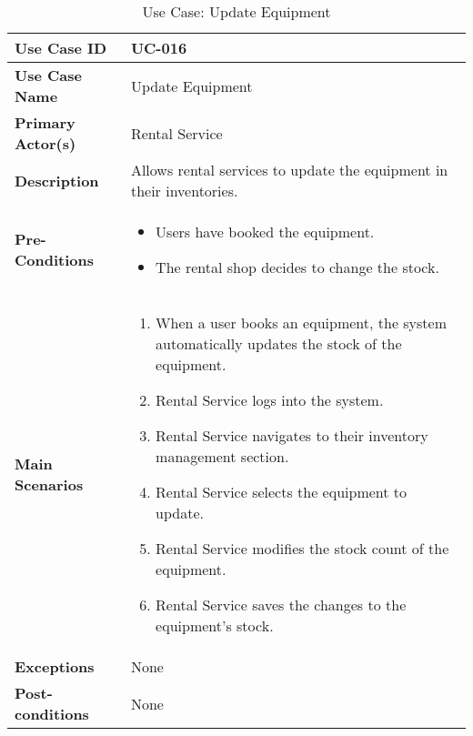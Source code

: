 \begin{table}[ht]
    \centering
    \begin{tabular}{|l|p{}|}
        \hline
        \textbf{Use Case ID} & UC-016 \\
        \hline
        \textbf{Use Case Name} & Update Equipment \\
        \hline
        \textbf{Primary Actor(s)} & Rental Service \\
        \hline
        \textbf{Description} & Allows rental services to update the equipment in their inventories. \\
        \hline
        \textbf{Pre-Conditions} & 
        \begin{itemize}[itemsep=0pt]
            \item Users have booked the equipment.
            \item The rental shop decides to change the stock.
        \end{itemize} \\
        \hline
        \textbf{Main Scenarios} & 
        \begin{enumerate}[label=\arabic*.,itemsep=0pt]
            \item When a user books an equipment, the system automatically updates the stock of the equipment.
            \item Rental Service logs into the system.
            \item Rental Service navigates to their inventory management section.
            \item Rental Service selects the equipment to update.
            \item Rental Service modifies the stock count of the equipment.
            \item Rental Service saves the changes to the equipment's stock.
        \end{enumerate} \\
        \hline
        \textbf{Exceptions} & None \\
        \hline
        \textbf{Post-conditions} & None \\
        \hline
    \end{tabular}
    \label{tab:use-case-update-equipment}
    \caption{Use Case: Update Equipment}
\end{table}


